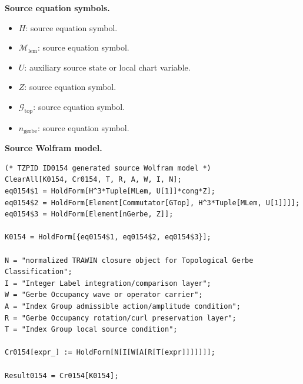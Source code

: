 \begin{minipage}[t]{0.49\linewidth}
\begingroup
\small
\raggedright
\textbf{Source equation symbols.}\par
\begin{itemize}[leftmargin=1.35em,itemsep=1pt,topsep=1pt,parsep=0pt]
    \item $H$: source equation symbol.
    \item $\mathcal{M}_{\mathrm{lem}}$: source equation symbol.
    \item $U$: auxiliary source state or local chart variable.
    \item $Z$: source equation symbol.
    \item $\mathcal{G}_{\mathrm{top}}$: source equation symbol.
    \item $n_{\mathrm{gerbe}}$: source equation symbol.
\end{itemize}
\endgroup
\end{minipage}\hfill
\begin{minipage}[t]{0.47\linewidth}
\begingroup
\scriptsize
\raggedright
\textbf{Source Wolfram model.}\par
\begin{Verbatim}[fontsize=\tiny,breaklines=true,breakanywhere=true]
(* TZPID ID0154 generated source Wolfram model *)
ClearAll[K0154, Cr0154, T, R, A, W, I, N];
eq0154$1 = HoldForm[H^3*Tuple[MLem, U[1]]*cong*Z];
eq0154$2 = HoldForm[Element[Commutator[GTop], H^3*Tuple[MLem, U[1]]]];
eq0154$3 = HoldForm[Element[nGerbe, Z]];

K0154 = HoldForm[{eq0154$1, eq0154$2, eq0154$3}];

N = "normalized TRAWIN closure object for Topological Gerbe Classification";
I = "Integer Label integration/comparison layer";
W = "Gerbe Occupancy wave or operator carrier";
A = "Index Group admissible action/amplitude condition";
R = "Gerbe Occupancy rotation/curl preservation layer";
T = "Index Group local source condition";

Cr0154[expr_] := HoldForm[N[I[W[A[R[T[expr]]]]]]];

Result0154 = Cr0154[K0154];
\end{Verbatim}
\endgroup
\end{minipage}

